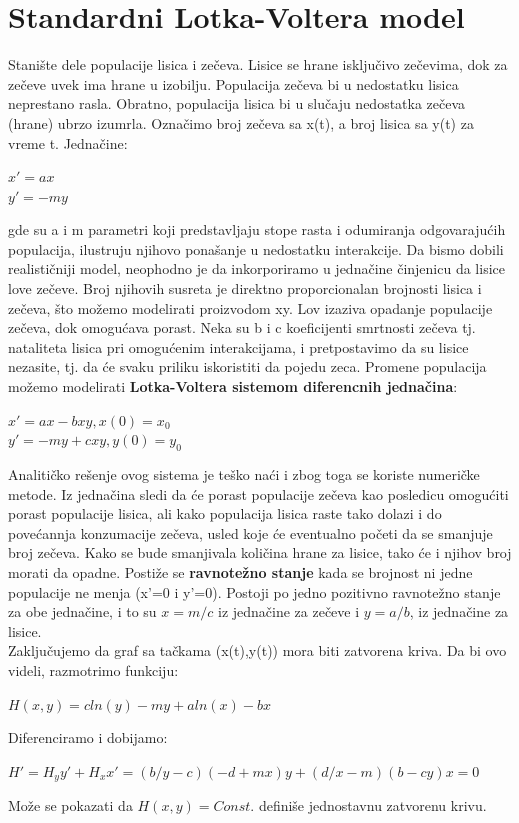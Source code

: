 \documentclass[a4paper]{article}
\begin{document}
\section{Standardni Lotka-Voltera model}
\label{sec:std_model}
Stanište dele populacije lisica i zečeva. Lisice se hrane isključivo zečevima,
dok za zečeve uvek ima hrane u izobilju. Populacija zečeva bi u nedostatku lisica
neprestano rasla. Obratno, populacija lisica bi u slučaju nedostatka zečeva (hrane) ubrzo izumrla.
Označimo broj zečeva sa x(t), a broj lisica sa y(t) za vreme t.
Jednačine:
	\begin{center}
	$x' = ax$ \\
	$y' = -my$
	\end{center}
gde su a i m parametri koji predstavljaju stope rasta i odumiranja odgovarajućih populacija,
ilustruju njihovo ponašanje u nedostatku interakcije.
Da bismo dobili realističniji model, neophodno je da inkorporiramo u jednačine
činjenicu da lisice love zečeve. Broj njihovih susreta je direktno proporcionalan
brojnosti lisica i zečeva, što možemo modelirati proizvodom xy. Lov izaziva opadanje
populacije zečeva, dok omogućava porast. Neka su b i c koeficijenti smrtnosti zečeva tj.
nataliteta lisica pri omogućenim interakcijama, i pretpostavimo da su lisice nezasite,
tj. da će svaku priliku iskoristiti da pojedu zeca.
Promene populacija možemo modelirati \textbf{Lotka-Voltera sistemom diferencnih jednačina}:
		\begin{center}
		$x' = ax - bxy,   x(0)=x_0$\\
		$y' = -my + cxy,  y(0)=y_0$
		\end{center}

Analitičko rešenje ovog sistema je teško naći i zbog toga se koriste numeričke metode.
Iz jednačina sledi da će porast populacije zečeva kao posledicu omogućiti porast populacije lisica,
ali kako populacija lisica raste tako dolazi i do povećannja konzumacije zečeva, usled koje će eventualno
početi da se smanjuje broj zečeva.
Kako se bude smanjivala količina hrane za lisice, tako će i njihov broj morati da opadne.
Postiže se \textbf{ravnotežno stanje} kada se brojnost ni jedne populacije ne menja (x'=0 i y'=0).
Postoji po jedno pozitivno ravnotežno stanje za obe jednačine, i to su $x=m/c$ iz jednačine za zečeve i $y=a/b$, iz jednačine za lisice.\\
Zaključujemo da  graf sa tačkama (x(t),y(t)) mora biti zatvorena kriva.
Da bi ovo videli, razmotrimo funkciju:
\begin{center}
	$H(x,y)=c ln(y) - my + a ln(x) - bx$
\end{center}
Diferenciramo i dobijamo:
\begin{center}
	$H'=H_y y' + H_x x' = (b/y - c)(-d + mx)y + (d/x - m)(b - cy)x = 0$
\end{center}
Može se pokazati da $H(x,y)=Const.$ definiše jednostavnu zatvorenu krivu.
\end{document}
